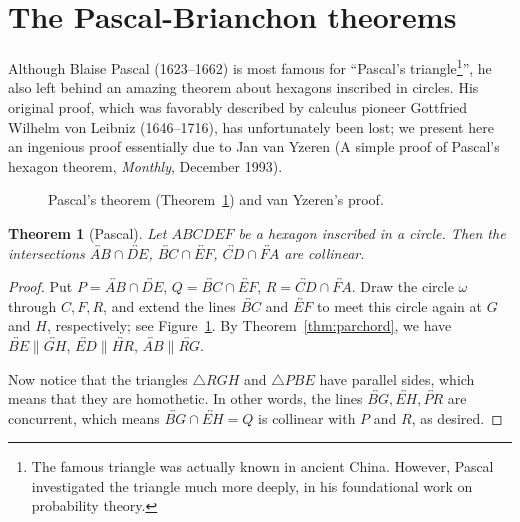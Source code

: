 \documentclass[12pt]{book}
\numberwithin{exc}{section}
\numberwithin{figure}{section}
\newtheorem{theorem}{Theorem}[section]
\numberwithin{equation}{theorem}
\def\line#1{\overleftrightarrow{#1}}
\begin{document}
\section{The Pascal-Brianchon theorems} \label{sec:pb}

Although Blaise Pascal (1623--1662)  is 
most famous for ``Pascal's triangle\footnote{The famous triangle
was actually known in ancient China. However, Pascal investigated
the triangle much more deeply, in his foundational work on probability
theory.}'', he also left behind an amazing theorem about hexagons
inscribed in circles.
His original proof, which was favorably described 
by calculus pioneer Gottfried Wilhelm von Leibniz (1646--1716),
has unfortunately been lost; we present here an ingenious 
proof essentially due to
Jan van Yzeren 
(A simple proof of Pascal's hexagon theorem, 
\textit{Monthly}, December 1993).

\begin{figure}
\caption{Pascal's theorem (Theorem~\ref{thm:pascal}) and van Yzeren's proof.}
\label{fig:pascal}
\end{figure}

 
\begin{theorem}[Pascal] \label{thm:pascal}
Let $ABCDEF$ be a hexagon inscribed in a circle. Then the 
intersections $\line{AB} \cap \line{DE}$, $\line{BC} \cap \line{EF}$,
$\line{CD} \cap \line{FA}$
are collinear.
\end{theorem}
\begin{proof}
Put $P = \line{AB} \cap \line{DE}$, $Q = \line{BC} \cap \line{EF}$, 
$R = \line{CD} \cap \line{FA}$. Draw the
circle $\omega$ through $C, F, R$,
and extend the lines $\line{BC}$ and $\line{EF}$ to meet this
circle again at $G$ and $H$, respectively; see Figure~\ref{fig:pascal}. By
Theorem~\ref{thm:parchord}, we have $\line{BE} \parallel \line{GH}$, 
$\line{ED} \parallel \line{HR}$, $\line{AB} \parallel
\line{RG}$.

Now notice that the triangles $\triangle RGH$ and $\triangle PBE$ 
have parallel sides, 
which means that they are homothetic. 
In other words, the lines $\line{BG}, 
\line{EH}, 
\line{PR}$ are concurrent, which means $\line{BG} \cap \line{EH} =
 Q$ is collinear with 
$P$ and $R$, as desired.
\end{proof}
\end{document}
